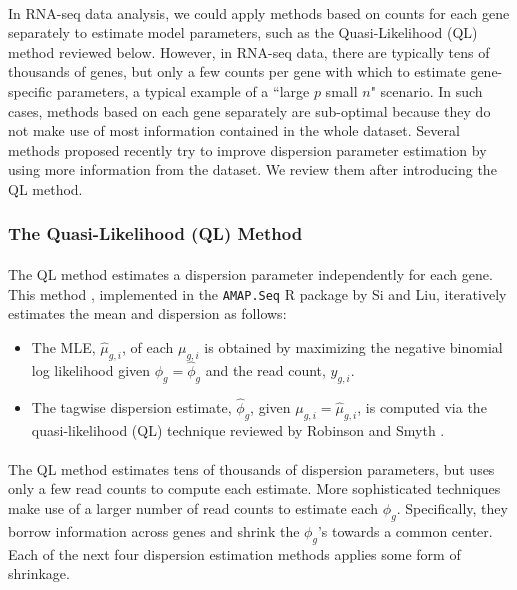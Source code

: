 \documentclass[10pt]{article}
\providecommand{\wh}[1]{\widehat{#1}}
\begin{document}
\paragraph{} \indent In RNA-seq data analysis, we could apply methods based on counts for each gene separately to estimate model parameters, such as the Quasi-Likelihood (QL) method reviewed below. However,
in RNA-seq data, there are typically tens of thousands of genes, but only a few counts per gene with which to estimate gene-specific parameters, a typical example of a ``large $p$ small $n$" scenario. In such cases, methods based on each gene separately are sub-optimal because they do not make use of most information contained in the whole dataset. Several methods proposed recently try to improve  dispersion parameter estimation by using more information from the dataset. We review them after introducing the QL method.

\subsubsection*{The Quasi-Likelihood (QL) Method} \label{subsec:amap}

\paragraph{} \indent The QL method estimates a dispersion parameter independently for each gene. This method \cite{amap_m} \cite{amap}, implemented in the {\tt AMAP.Seq} R package by Si and Liu, iteratively estimates the mean and dispersion as follows:

\begin{itemize}
\item The MLE, $\wh{\mu}_{g, i}$, of each $\mu_{g, i}$ is obtained by maximizing the negative binomial log likelihood given $\phi_g = \wh{\phi}_g$ and the read count, $y_{g, i}$.
\item The tagwise dispersion estimate, $\wh{\phi}_g$, given $\mu_{g, i} = \wh{\mu}_{g, i}$, is computed via the quasi-likelihood (QL) technique reviewed by Robinson and Smyth \cite{rs08}.
\end{itemize}

\paragraph{} \indent The QL method estimates tens of thousands of dispersion parameters, but uses only a few read counts to compute each estimate. More sophisticated techniques make use of a larger number of read counts to estimate each $\phi_g$. Specifically, they borrow information across genes and shrink %
the $\phi_g$'s towards a common center. Each of the next four dispersion estimation methods applies some form of shrinkage.
\end{document}
